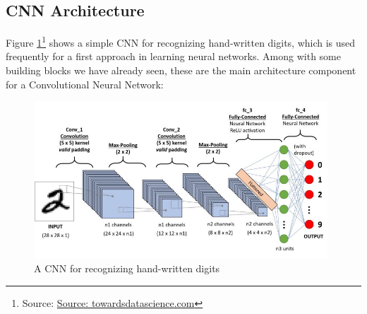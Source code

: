 \subsection{CNN Architecture}
Figure \ref{fig:CNN}\footnote{Source: \href{https://towardsdatascience.com/a-comprehensive-guide-to-convolutional-neural-networks-the-eli5-way-3bd2b1164a53}{Source: towardsdatascience.com}} shows a simple CNN for recognizing hand-written digits, which is used frequently for a first approach in learning neural networks. Among with some building blocks we have already seen, these are the main architecture component for a Convolutional Neural Network:

\begin{figure}[h]
	\centering
	\includegraphics[width=11cm]{images/CNN.jpeg}
	\caption{A CNN for recognizing hand-written digits}
	\label{fig:CNN}
\end{figure}


